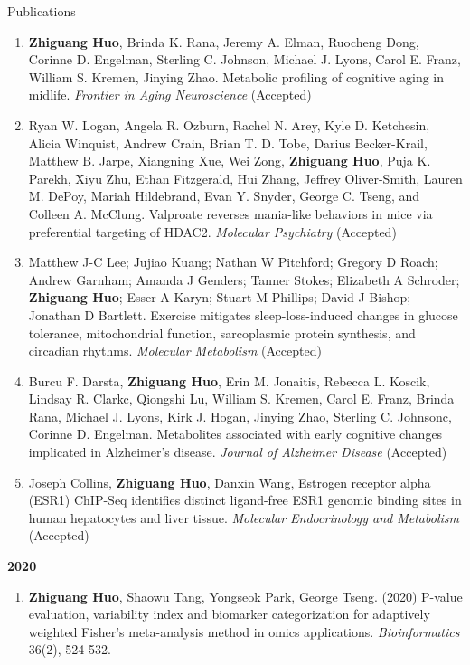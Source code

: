 \documentclass{resume} %
\begin{document}
\begin{rSection}{Publications}
\begin{enumerate}[noitemsep,topsep=0pt, resume]
\item  {\bf Zhiguang Huo}, Brinda K. Rana, Jeremy A. Elman, Ruocheng Dong, Corinne D. Engelman, Sterling C. Johnson, Michael J. Lyons, Carol E. Franz, William S. Kremen, Jinying Zhao.
Metabolic profiling of cognitive aging in midlife.
\emph{Frontier in Aging Neuroscience} (Accepted)

\item
Ryan W. Logan, Angela R. Ozburn, Rachel N. Arey, Kyle D. Ketchesin, Alicia Winquist, Andrew Crain, Brian T. D. Tobe, Darius Becker-Krail, Matthew B. Jarpe, Xiangning Xue, Wei Zong, {\bf Zhiguang Huo}, Puja K. Parekh, Xiyu Zhu, Ethan Fitzgerald, Hui Zhang, Jeffrey Oliver-Smith, Lauren M. DePoy, Mariah Hildebrand, Evan Y. Snyder, George C. Tseng, and Colleen A. McClung. Valproate reverses mania-like behaviors in mice via preferential targeting of HDAC2. \emph{Molecular Psychiatry} (Accepted)

\item  
Matthew J-C Lee; Jujiao Kuang; Nathan W Pitchford; Gregory D Roach; Andrew Garnham; Amanda J Genders; Tanner Stokes; Elizabeth A Schroder; {\bf Zhiguang Huo}; Esser A Karyn; Stuart M Phillips; David J Bishop; Jonathan D Bartlett.
Exercise mitigates sleep-loss-induced changes in glucose tolerance, mitochondrial function, sarcoplasmic protein synthesis, and circadian rhythms.
\emph{Molecular Metabolism} (Accepted)


\item  
Burcu F. Darsta, {\bf Zhiguang Huo}, Erin M. Jonaitis, Rebecca L. Koscik, Lindsay R. Clarkc, Qiongshi Lu, William S. Kremen, Carol E. Franz, Brinda Rana, Michael J. Lyons, Kirk J. Hogan, Jinying Zhao, Sterling C. Johnsonc, Corinne D. Engelman.
Metabolites associated with early cognitive changes implicated in Alzheimer's disease.
\emph{Journal of Alzheimer Disease} (Accepted)


\item  Joseph Collins, {\bf Zhiguang Huo}, Danxin Wang, 
Estrogen receptor alpha (ESR1) ChIP-Seq identifies distinct ligand-free ESR1 genomic binding sites in human hepatocytes and liver tissue.
\emph{Molecular Endocrinology and Metabolism} (Accepted)


\end{enumerate}


\textbf{2020}
\begin{enumerate}[noitemsep,topsep=0pt, resume]


\item  {\bf  Zhiguang Huo}, Shaowu Tang, Yongseok Park, George Tseng. (2020) 
P-value evaluation, variability index and biomarker categorization for adaptively weighted Fisher's meta-analysis method in omics applications. 
\emph{Bioinformatics} 36(2), 524-532.


\end{enumerate}
\end{rSection}
\end{document}
